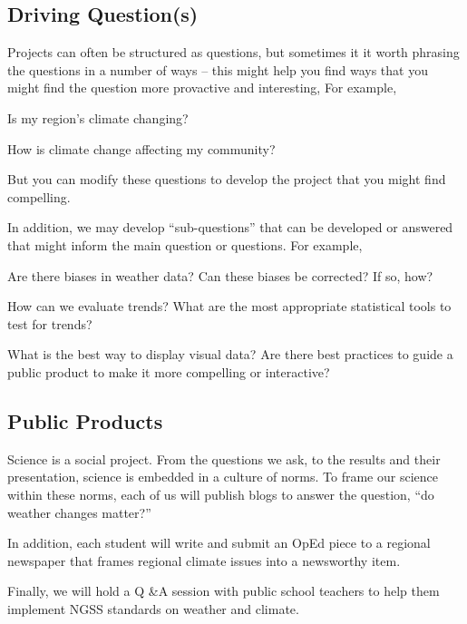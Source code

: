 \documentclass{article}\usepackage[]{graphicx}\usepackage[]{color}
\newenvironment{itemize*}%
  {\begin{itemize}%
    \setlength{\itemsep}{0pt}%
    \setlength{\parskip}{0pt}}%
  {\end{itemize}}
\begin{document}
\subsection{Driving Question(s)}

Projects can often be structured as questions, but sometimes it it worth phrasing the questions in a number of ways -- this might help you find ways that you might find the question more provactive and interesting, For example,

\begin{itemize*}
  \item Is my region's climate changing?
  \item How is climate change affecting my community?
\end{itemize*}

But you can modify these questions to develop the project that you might find compelling.

In addition, we may develop ``sub-questions'' that can be developed or answered that might inform the main question or questions. For example, 

\begin{itemize*}
  \item Are there biases in weather data? Can these biases be corrected? If so, how?
  \item How can we evaluate trends? What are the most appropriate statistical tools to test for trends?
  \item What is the best way to display visual data?  Are there best practices to guide a public product to make it more compelling or interactive?
\end{itemize*}

\subsection{Public Products}

Science is a social project. From the questions we ask, to the results and their presentation, science is embedded in a culture of norms. To frame our science within these norms, each of us will publish blogs to answer the question, ``do weather changes matter?''

In addition, each student will write and submit an OpEd piece to a regional newspaper that frames regional climate issues into a newsworthy item.

Finally, we will hold a Q \&A session with public school teachers to help them implement NGSS standards on weather and climate.
\end{document}
